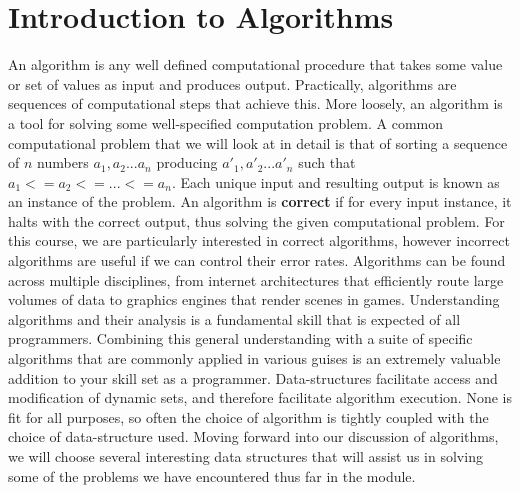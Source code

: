 \documentclass[10pt,a4paper]{article}
\begin{document}
\section{Introduction to Algorithms}
An algorithm is any well defined computational procedure that takes some value or set of values as input and produces output. Practically, algorithms are sequences of computational steps that achieve this. More loosely, an algorithm is a tool for solving some well-specified computation problem. A common computational problem that we will look at in detail is that of sorting a sequence of $n$ numbers $a_1,a_2...a_n$ producing $a'_1,a'_2...a'_n$ such that $a_1 <= a_2 <= ... <= a_n$. Each unique input and resulting output is known as an instance of the problem. 
\newline\newline
An algorithm is {\bf correct} if for every input instance, it halts with the correct output, thus solving the given computational problem. For this course, we are particularly interested in correct algorithms, however incorrect algorithms are useful if we can control their error rates. 
\newline\newline
Algorithms can be found across multiple disciplines, from internet architectures that efficiently route large volumes of data to graphics engines that render scenes in games. Understanding algorithms and their analysis is a fundamental skill that is expected of all programmers. Combining this general understanding with a suite of specific algorithms that are commonly applied in various guises is an extremely valuable addition to your skill set as a programmer. 
\newline\newline
Data-structures facilitate access and modification of dynamic sets, and therefore facilitate algorithm execution. None is fit for all purposes, so often the choice of algorithm is tightly coupled with the choice of data-structure used. Moving forward into our discussion of algorithms, we will choose several interesting data structures that will assist us in solving some of the problems we have encountered thus far in the module. 
\end{document}
